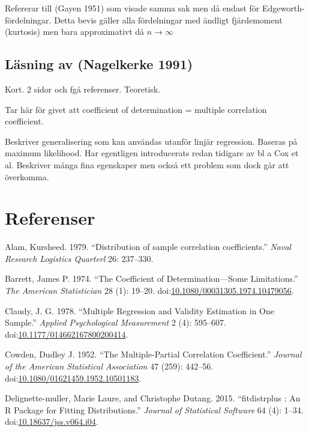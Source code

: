 \documentclass[]{article}
\begin{document}
Refererar till (Gayen 1951) som visade samma sak men då endast för
Edgeworth-fördelningar. Detta bevis gäller alla fördelningar med ändligt
fjärdemoment (kurtosis) men bara approximativt då
\(n \rightarrow \infty\)

\subsection{Läsning av (Nagelkerke
1991)}\label{lasning-av-nagelkerke1991}

Kort. 2 sidor och fgå referenser. Teoretisk.

Tar här för givet att coefficient of determination = multiple
correlation coefficient.

Beskriver generalisering som kan användas utanför linjär regression.
Baseras på maximum likelihood. Har egentligen introducerats redan
tidigare av bl a Cox et al. Beskriver många fina egenskaper men också
ett problem som dock går att överkomma.

\section*{Referenser}\label{referenser}

\hypertarget{refs}{}
\hypertarget{ref-Alam1979}{}
Alam, Kursheed. 1979. ``Distribution of sample correlation
coefficients.'' \emph{Naval Research Logistics Quarterl} 26: 237--330.

\hypertarget{ref-Barrett1974}{}
Barrett, James P. 1974. ``The Coefficient of Determination---Some
Limitations.'' \emph{The American Statistician} 28 (1): 19--20.
doi:\href{https://doi.org/10.1080/00031305.1974.10479056}{10.1080/00031305.1974.10479056}.

\hypertarget{ref-Claudy1978}{}
Claudy, J. G. 1978. ``Multiple Regression and Validity Estimation in One
Sample.'' \emph{Applied Psychological Measurement} 2 (4): 595--607.
doi:\href{https://doi.org/10.1177/014662167800200414}{10.1177/014662167800200414}.

\hypertarget{ref-Cowden1952}{}
Cowden, Dudley J. 1952. ``The Multiple-Partial Correlation
Coefficient.'' \emph{Journal of the American Statistical Association} 47
(259): 442--56.
doi:\href{https://doi.org/10.1080/01621459.1952.10501183}{10.1080/01621459.1952.10501183}.

\hypertarget{ref-fitdistrplus}{}
Delignette-muller, Marie Laure, and Christophe Dutang. 2015.
``fitdistrplus : An R Package for Fitting Distributions.'' \emph{Journal
of Statistical Software} 64 (4): 1--34.
doi:\href{https://doi.org/10.18637/jss.v064.i04}{10.18637/jss.v064.i04}.
\end{document}
